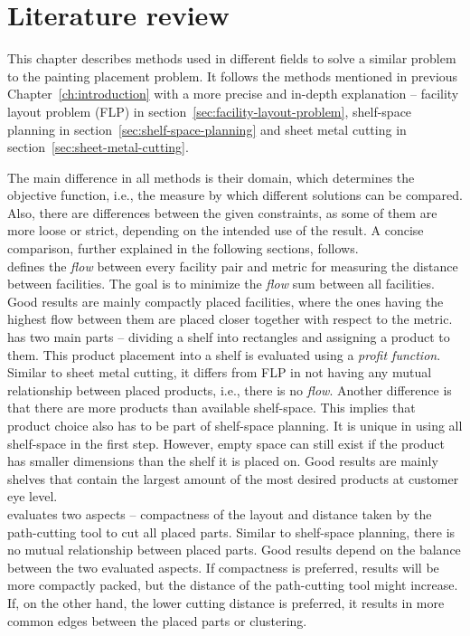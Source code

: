 \chapter{Literature review}\label{ch:literature-review}

This chapter describes methods used in different fields to solve a similar problem to the painting placement problem.
It follows the methods mentioned in previous Chapter~\ref{ch:introduction} with
a more precise and in-depth explanation – facility layout problem (FLP) in section~\ref{sec:facility-layout-problem},
shelf-space planning in section~\ref{sec:shelf-space-planning} and sheet metal cutting in section~\ref{sec:sheet-metal-cutting}.

The main difference in all methods is their domain, which determines the objective function, i.e.,
the measure by which different solutions can be compared.
Also, there are differences between the given constraints, as some of them are more loose or strict,
depending on the intended use of the result.
A concise comparison, further explained in the following sections, follows.\\

 defines the \textit{flow} between every facility pair and metric for measuring the distance between facilities.
The goal is to minimize the \textit{flow} sum between all facilities.
Good results are mainly compactly placed facilities, where the ones having the
highest flow between them are placed closer together with respect to the metric.\\

 has two main parts – dividing a shelf into rectangles and assigning a product to them.
This product placement into a shelf is evaluated using a \textit{profit function}. Similar to sheet metal cutting, it differs from FLP
in not having any mutual relationship between placed products, i.e., there is no \textit{flow}.
Another difference is that there are more products than available shelf-space.
This implies that product choice also has to be part of shelf-space planning.
It is unique in using all shelf-space in the first step.
However, empty space can still exist if the product has smaller dimensions than the shelf it is placed on.
Good results are mainly shelves that contain the largest amount of the most desired products at customer eye level.\\

 evaluates two aspects – compactness of the layout and distance taken by the path-cutting tool to cut all placed parts.
Similar to shelf-space planning, there is no mutual relationship between placed parts.
Good results depend on the balance between the two evaluated aspects.
If compactness is preferred, results will be more compactly packed, but the distance of the path-cutting tool might increase.
If, on the other hand, the lower cutting distance is preferred, it results in more common edges between the placed parts or clustering.\\







